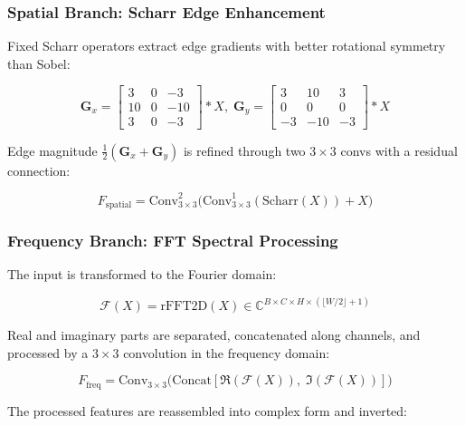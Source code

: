 \documentclass[10pt,twocolumn]{IEEEtran}
\begin{document}
\subsubsection{Spatial Branch: Scharr Edge Enhancement}

Fixed Scharr operators extract edge gradients with better rotational symmetry
than Sobel:

\begin{equation}
\label{eq:scharr}
\mathbf{G}_x \!=\! \begin{bmatrix} 3 & 0 & -3 \\ 10 & 0 & -10 \\ 3 & 0 & -3 \end{bmatrix} * X,\;
\mathbf{G}_y \!=\! \begin{bmatrix} 3 & 10 & 3 \\ 0 & 0 & 0 \\ -3 & -10 & -3 \end{bmatrix} * X
\end{equation}

Edge magnitude $\frac{1}{2}(\mathbf{G}_x + \mathbf{G}_y)$ is refined
through two $3\times3$ convs with a residual connection:

\begin{equation}
\label{eq:spatial}
F_{\text{spatial}} = \text{Conv}_{3\times3}^2\big(\text{Conv}_{3\times3}^1(\text{Scharr}(X)) + X\big)
\end{equation}

\subsubsection{Frequency Branch: FFT Spectral Processing}

The input is transformed to the Fourier domain:

\begin{equation}
\label{eq:fft}
\mathcal{F}(X) = \text{rFFT2D}(X) \in \mathbb{C}^{B \times C \times H \times (\lfloor W/2 \rfloor + 1)}
\end{equation}

Real and imaginary parts are separated, concatenated along channels, and
processed by a $3\times3$ convolution in the frequency domain:

\begin{equation}
\label{eq:freq_conv}
F_{\text{freq}} = \text{Conv}_{3\times3}\big(\text{Concat}[\Re(\mathcal{F}(X)),\; \Im(\mathcal{F}(X))]\big)
\end{equation}

The processed features are reassembled into complex form and inverted:
\end{document}
